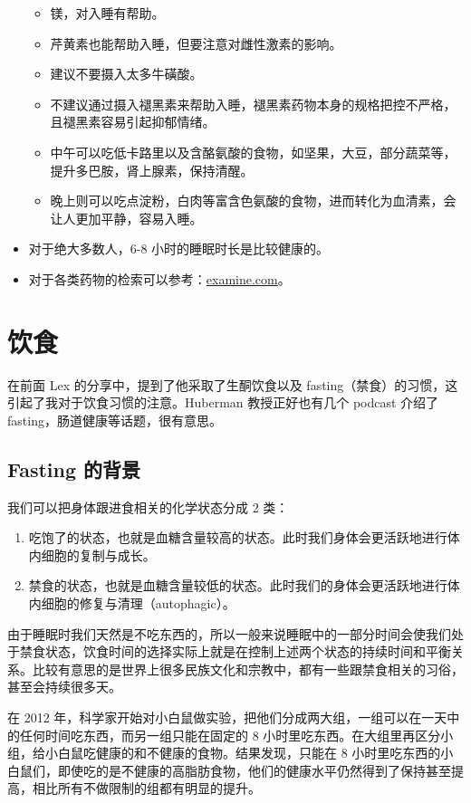 \documentclass{report}
\begin{document}
\begin{itemize}
\begin{itemize}
        \item 镁，对入睡有帮助。
        \item 芹黄素也能帮助入睡，但要注意对雌性激素的影响。
        \item 建议不要摄入太多牛磺酸。
        \item 不建议通过摄入褪黑素来帮助入睡，褪黑素药物本身的规格把控不严格，且褪黑素容易引起抑郁情绪。
        \item 中午可以吃低卡路里以及含酪氨酸的食物，如坚果，大豆，部分蔬菜等，提升多巴胺，肾上腺素，保持清醒。
        \item 晚上则可以吃点淀粉，白肉等富含色氨酸的食物，进而转化为血清素，会让人更加平静，容易入睡。
    \end{itemize}
    \item 对于绝大多数人，6-8 小时的睡眠时长是比较健康的。
    \item 对于各类药物的检索可以参考：\href{https://examine.com/}{examine.com}。
\end{itemize}

\chapter{饮食}

在前面 Lex 的分享中，提到了他采取了生酮饮食以及 fasting（禁食）的习惯，这引起了我对于饮食习惯的注意。Huberman 教授正好也有几个 podcast 介绍了 fasting，肠道健康等话题，很有意思。

\section{Fasting 的背景}

我们可以把身体跟进食相关的化学状态分成 2 类：

\begin{enumerate}
    \item 吃饱了的状态，也就是血糖含量较高的状态。此时我们身体会更活跃地进行体内细胞的复制与成长。
    \item 禁食的状态，也就是血糖含量较低的状态。此时我们的身体会更活跃地进行体内细胞的修复与清理（autophagic）。
\end{enumerate}

由于睡眠时我们天然是不吃东西的，所以一般来说睡眠中的一部分时间会使我们处于禁食状态，饮食时间的选择实际上就是在控制上述两个状态的持续时间和平衡关系。比较有意思的是世界上很多民族文化和宗教中，都有一些跟禁食相关的习俗，甚至会持续很多天。

在 2012 年，科学家开始对小白鼠做实验，把他们分成两大组，一组可以在一天中的任何时间吃东西，而另一组只能在固定的 8 小时里吃东西。在大组里再区分小组，给小白鼠吃健康的和不健康的食物。结果发现，只能在 8 小时里吃东西的小白鼠们，即使吃的是不健康的高脂肪食物，他们的健康水平仍然得到了保持甚至提高，相比所有不做限制的组都有明显的提升。
\end{document}
